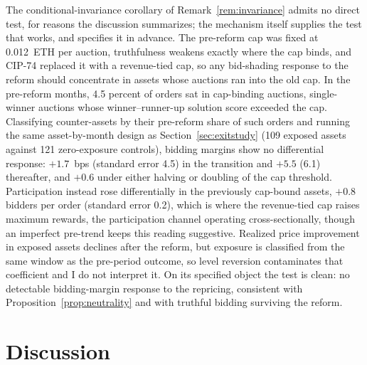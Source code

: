 \documentclass[11pt]{article}
\theoremstyle{plain}
\theoremstyle{definition}
\theoremstyle{remark}
\begin{document}
The conditional-invariance corollary of Remark~\ref{rem:invariance} admits no direct test, for reasons the discussion summarizes; the mechanism itself supplies the test that works, and specifies it in advance. The pre-reform cap was fixed at 0.012~ETH per auction, truthfulness weakens exactly where the cap binds, and CIP-74 replaced it with a revenue-tied cap, so any bid-shading response to the reform should concentrate in assets whose auctions ran into the old cap. In the pre-reform months, 4.5 percent of orders sat in cap-binding auctions, single-winner auctions whose winner--runner-up solution score exceeded the cap. Classifying counter-assets by their pre-reform share of such orders and running the same asset-by-month design as Section~\ref{sec:exitstudy} (109 exposed assets against 121 zero-exposure controls), bidding margins show no differential response: $+1.7$~bps (standard error 4.5) in the transition and $+5.5$ (6.1) thereafter, and $+0.6$ under either halving or doubling of the cap threshold. Participation instead rose differentially in the previously cap-bound assets, $+0.8$ bidders per order (standard error 0.2), which is where the revenue-tied cap raises maximum rewards, the participation channel operating cross-sectionally, though an imperfect pre-trend keeps this reading suggestive. Realized price improvement in exposed assets declines after the reform, but exposure is classified from the same window as the pre-period outcome, so level reversion contaminates that coefficient and I do not interpret it. On its specified object the test is clean: no detectable bidding-margin response to the repricing, consistent with Proposition~\ref{prop:neutrality} and with truthful bidding surviving the reform.


\section{Discussion}\label{sec:discussion}
\end{document}
